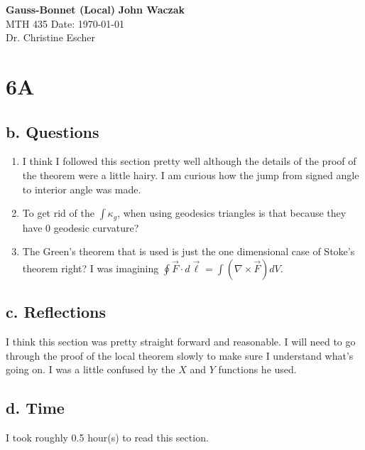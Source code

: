 \documentclass[a4paper, 11pt]{article}
\begin{document}
\noindent
\large\textbf{Gauss-Bonnet (Local)} \hfill \textbf{John Waczak} \\
\normalsize MTH 435 \hfill  Date: \today \\
Dr. Christine Escher \\

\section*{6A}
\subsection*{b. Questions}
	\begin{enumerate}
		\item I think I followed this section pretty well although the details of the proof of the theorem were a little hairy. I am curious how the jump from signed angle to interior angle was made. \\ 
		\item To get rid of the $\int \kappa_g$, when using geodesics triangles is that because they have 0 geodesic curvature? 
		\item The Green's theorem that is used is just the one dimensional case of Stoke's theorem right? I was imagining $\oint \vec{F}\cdot d\vec{\ell} = \int (\nabla \times \vec{F}) dV$. 
	\end{enumerate}
\subsection*{c. Reflections}
		I think this section was pretty straight forward and reasonable. I will need to go through the proof of the local theorem slowly to make sure I understand what's going on. I was a little confused by the $X$ and $Y$ functions he used. 
\subsection*{d. Time}
I took roughly 0.5 hour(s) to read this section. 
\end{document}
